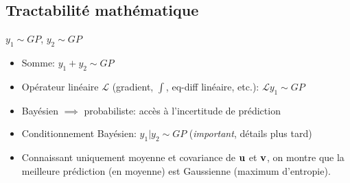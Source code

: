 \documentclass[xcolor=svgnames, t]{beamer}
\newcommand{\vectorx}[1]{\boldsymbol{\MakeLowercase{\mathbf{#1}}}}
\newcommand{\coloredemph}[1]{\textcolor{internationalblue}{\emph{#1}}}
\begin{document}
\subsection{Tractabilité mathématique}

\begin{frame}{\subsecname}
  
$y_1 \sim GP$, $y_2 \sim GP$
\begin{itemize}
  \pause
  \item Somme: $y_1 + y_2 \sim GP$
  \pause
  \item Opérateur linéaire $\mathcal{L}$ (gradient, $\int$, eq-diff linéaire, etc.):
  $\mathcal{L}y_1 \sim GP$
  \item Bayésien $\implies$ probabiliste: accès à l'incertitude de prédiction
  \pause
  \item Conditionnement Bayésien: $y_1 | y_2 \sim GP$ (\coloredemph{important}, détails plus tard)
  \pause
  \item Connaissant uniquement moyenne et covariance de $\vectorx{u}$ et $\vectorx{v}$,
  on montre que la meilleure prédiction (en moyenne) est Gaussienne (maximum d'entropie).
\end{itemize}
\end{frame}

\end{document}
